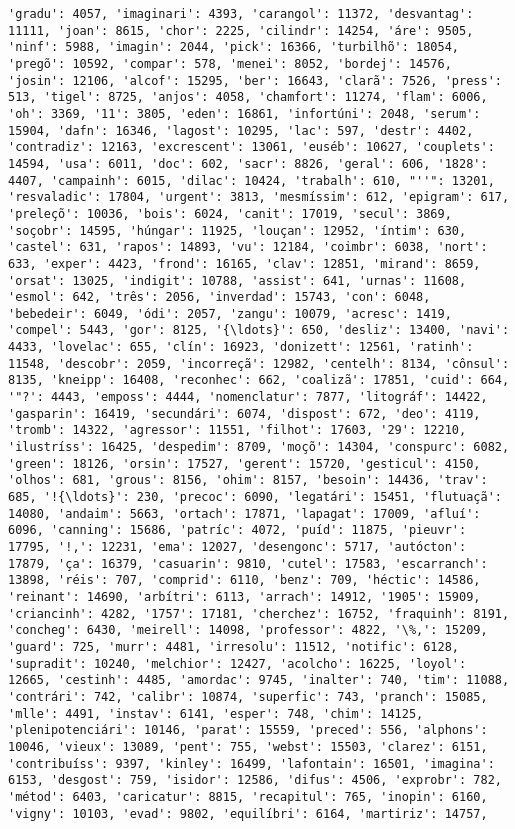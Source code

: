\begin{Verbatim}[commandchars=\\\{\}]
'gradu': 4057, 'imaginari': 4393, 'carangol': 11372, 'desvantag': 11111, 'joan': 8615, 'chor': 2225, 'cilindr': 14254, 'áre': 9505, 'ninf': 5988, 'imagin': 2044, 'pick': 16366, 'turbilhõ': 18054, 'pregõ': 10592, 'compar': 578, 'menei': 8052, 'bordej': 14576, 'josin': 12106, 'alcof': 15295, 'ber': 16643, 'clarã': 7526, 'press': 513, 'tigel': 8725, 'anjos': 4058, 'chamfort': 11274, 'flam': 6006, 'oh': 3369, '11': 3805, 'eden': 16861, 'infortúni': 2048, 'serum': 15904, 'dafn': 16346, 'lagost': 10295, 'lac': 597, 'destr': 4402, 'contradiz': 12163, 'excrescent': 13061, 'euséb': 10627, 'couplets': 14594, 'usa': 6011, 'doc': 602, 'sacr': 8826, 'geral': 606, '1828': 4407, 'campainh': 6015, 'dilac': 10424, 'trabalh': 610, "''": 13201, 'resvaladic': 17804, 'urgent': 3813, 'mesmíssim': 612, 'epigram': 617, 'preleçõ': 10036, 'bois': 6024, 'canit': 17019, 'secul': 3869, 'soçobr': 14595, 'húngar': 11925, 'louçan': 12952, 'íntim': 630, 'castel': 631, 'rapos': 14893, 'vu': 12184, 'coimbr': 6038, 'nort': 633, 'exper': 4423, 'frond': 16165, 'clav': 12851, 'mirand': 8659, 'orsat': 13025, 'indigit': 10788, 'assist': 641, 'urnas': 11608, 'esmol': 642, 'três': 2056, 'inverdad': 15743, 'con': 6048, 'bebedeir': 6049, 'ódi': 2057, 'zangu': 10079, 'acresc': 1419, 'compel': 5443, 'gor': 8125, '{\ldots}': 650, 'desliz': 13400, 'navi': 4433, 'lovelac': 655, 'clín': 16923, 'donizett': 12561, 'ratinh': 11548, 'descobr': 2059, 'incorreçã': 12982, 'centelh': 8134, 'cônsul': 8135, 'kneipp': 16408, 'reconhec': 662, 'coalizã': 17851, 'cuid': 664, '"?': 4443, 'emposs': 4444, 'nomenclatur': 7877, 'litográf': 14422, 'gasparin': 16419, 'secundári': 6074, 'dispost': 672, 'deo': 4119, 'tromb': 14322, 'agressor': 11551, 'filhot': 17603, '29': 12210, 'ilustríss': 16425, 'despedim': 8709, 'moçõ': 14304, 'conspurc': 6082, 'green': 18126, 'orsin': 17527, 'gerent': 15720, 'gesticul': 4150, 'olhos': 681, 'grous': 8156, 'ohim': 8157, 'besoin': 14436, 'trav': 685, '!{\ldots}': 230, 'precoc': 6090, 'legatári': 15451, 'flutuaçã': 14080, 'andaim': 5663, 'ortach': 17871, 'lapagat': 17009, 'afluí': 6096, 'canning': 15686, 'patríc': 4072, 'puíd': 11875, 'pieuvr': 17795, '!,': 12231, 'ema': 12027, 'desengonc': 5717, 'autócton': 17879, 'ça': 16379, 'casuarin': 9810, 'cutel': 17583, 'escarranch': 13898, 'réis': 707, 'comprid': 6110, 'benz': 709, 'héctic': 14586, 'reinant': 14690, 'arbítri': 6113, 'arrach': 14912, '1905': 15909, 'criancinh': 4282, '1757': 17181, 'cherchez': 16752, 'fraquinh': 8191, 'concheg': 6430, 'meirell': 14098, 'professor': 4822, '\%,': 15209, 'guard': 725, 'murr': 4481, 'irresolu': 11512, 'notific': 6128, 'supradit': 10240, 'melchior': 12427, 'acolcho': 16225, 'loyol': 12665, 'cestinh': 4485, 'amordac': 9745, 'inalter': 740, 'tim': 11088, 'contrári': 742, 'calibr': 10874, 'superfic': 743, 'pranch': 15085, 'mlle': 4491, 'instav': 6141, 'esper': 748, 'chim': 14125, 'plenipotenciári': 10146, 'parat': 15559, 'preced': 556, 'alphons': 10046, 'vieux': 13089, 'pent': 755, 'webst': 15503, 'clarez': 6151, 'contribuíss': 9397, 'kinley': 16499, 'lafontain': 16501, 'imagina': 6153, 'desgost': 759, 'isidor': 12586, 'difus': 4506, 'exprobr': 782, 'métod': 6403, 'caricatur': 8815, 'recapitul': 765, 'inopin': 6160, 'vigny': 10103, 'evad': 9802, 'equilíbri': 6164, 'martiriz': 14757, 
\end{Verbatim}

